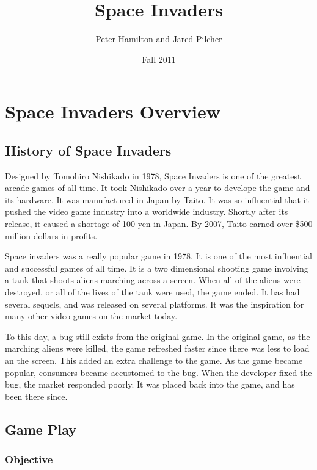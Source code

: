 \documentclass[11pt,letter,oneside]{report}
\begin{document}
\title{Space Invaders}
\author{Peter Hamilton and Jared Pilcher}
\date{Fall 2011}
\maketitle

\tableofcontents

\chapter{Space Invaders Overview}
\section{History of Space Invaders}

Designed by Tomohiro Nishikado in 1978, Space Invaders is one of the greatest arcade games of all time. It took Nishikado over a year to develope the game and its hardware. It was manufactured in Japan by Taito. It was so influential that it pushed the video game industry into a worldwide industry. Shortly after its release, it caused a shortage of 100-yen in Japan. By 2007, Taito earned over \$500 million dollars in profits. 

Space invaders was a really popular game in 1978. It is one of the most influential and successful games of all time. It is a two dimensional shooting game involving a tank that shoots aliens marching across a screen. When all of the aliens were destroyed, or all of the lives of the tank were used, the game ended. It has had several sequels, and was released on several platforms. It was the inspiration for many other video games on the market today. 

To this day, a bug still exists from the original game. In the original game, as the marching aliens were killed, the game refreshed faster since there was less to load an the screen. This added an extra challenge to the game. As the game became popular, consumers became accustomed to the bug. When the developer fixed the bug, the market responded poorly. It was placed back into the game, and has been there since.
 
\section{Game Play}

\subsection{Objective}
\end{document}
